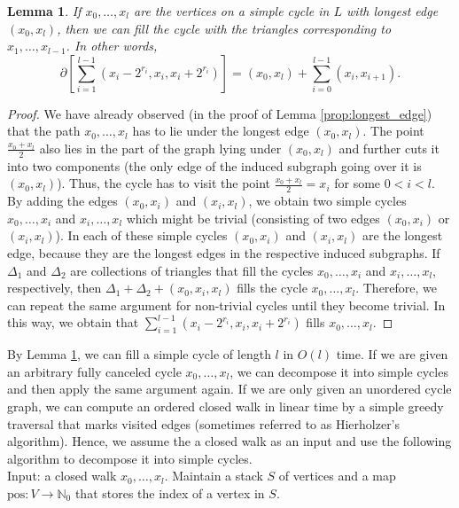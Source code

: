 \documentclass[11pt]{article}
\newtheorem{lemma}[theorem]{Lemma}
\begin{document}
%
%
\begin{lemma} \label{prop:filling_simple_cycles}
If $x_0,\ldots,x_l$ are the vertices on a simple cycle in $L$ with longest edge $(x_0,x_l)$, then we can fill the cycle with the triangles corresponding to $x_1,\ldots,x_{l-1}$. In other words,
\begin{equation*}
\partial\left[\sum _{i=1}^{l-1}(x_i-2^{r_i},x_i,x_i+2^{r_i})\right]=(x_0,x_l)+\sum_{i=0}^{l-1} (x_i,x_{i+1}).
\end{equation*}
\end{lemma}
%
\begin{proof}
We have already observed (in the proof of Lemma \ref{prop:longest_edge}) that the path $x_0,\ldots,x_l$ has to lie under the longest edge $(x_0,x_l)$. The point $\frac{x_0+x_l}{2}$ also lies in the part of the graph lying under $(x_0,x_l)$ and further cuts it into two components (the only edge of the induced subgraph going over it is $(x_0,x_l)$). Thus, the cycle has to visit the point $\frac{x_0+x_l}{2}=x_i$ for some $0<i<l$. By adding the edges $(x_0,x_i)$ and $(x_i,x_l)$, we obtain two simple cycles $x_0,\ldots,x_i$ and $x_i,\ldots,x_l$ which might be trivial (consisting of two edges $(x_0,x_i)$ or $(x_i,x_l)$). In each of these simple cycles $(x_0,x_i)$ and $(x_i,x_l)$ are the longest edge, because they are the longest edges in the respective induced subgraphs. If $\Delta_1$ and $\Delta_2$ are collections of triangles that fill the cycles $x_0,\ldots,x_i$ and $x_i,\ldots,x_l$, respectively, then $\Delta_1+\Delta_2+(x_0,x_i,x_l)$ fills the cycle $x_0,\ldots,x_l$. Therefore, we can repeat the same argument for non-trivial cycles until they become trivial. In this way, we obtain that $\sum _{i=1}^{l-1}(x_i-2^{r_i},x_i,x_i+2^{r_i})$ fills $x_0,\ldots,x_l$.
\end{proof}
%
By Lemma \ref{prop:filling_simple_cycles}, we can fill a simple cycle of length $l$ in $O(l)$ time. If we are given an arbitrary fully canceled cycle $x_0,\ldots,x_l$, we can decompose it into simple cycles and then apply the same argument again. If we are only given an unordered cycle graph, we can compute an ordered closed walk in linear time by a simple greedy traversal that marks visited edges (sometimes referred to as Hierholzer's algorithm). Hence, we assume the a closed walk as an input and use the following algorithm to decompose it into simple cycles. \\
%
Input: a closed walk $x_0,\ldots,x_l$. Maintain a stack $S$ of vertices and a map $\text{pos}\colon V\rightarrow \mathbb{N}_0$ that stores
the index of a vertex in $S$.
\end{document}
